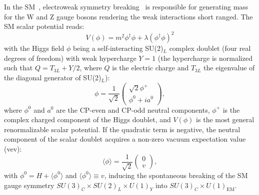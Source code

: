 In the SM~\cite{Glashow:1961tr,PhysRevLett.19.1264,PhysRevD.2.1285}, electroweak symmetry breaking~\cite{PhysRevLett.13.321,PhysRev.145.1156} is responsible for generating mass for the W and Z gauge bosons rendering the weak interactions short ranged.
The SM scalar potential reads:
\begin{equation}
    V (\phi) = m^2\phi^\dagger\phi + \lambda(\phi^\dagger\phi)^2
\end{equation}
with the Higgs field $\phi$ being a self-interacting SU(2)$_L$ complex doublet (four real degrees of freedom) with weak hypercharge $Y = 1$ (the hypercharge is normalized such that $Q = T_{3L} + Y /2$, where $Q$ is the electric charge and $T_{3L}$ the eigenvalue of the diagonal generator of SU(2)$_L$):
\begin{equation}
    \phi = \frac{1}{\sqrt{2}}
    \begin{pmatrix}
        \sqrt{2}\phi^+ \\
        \phi^0 + ia^0
    \end{pmatrix},
\end{equation}
where $\phi^0$ and $a^0$ are the CP-even and CP-odd neutral components, $\phi^+$ is the complex charged component of the Higgs doublet, and $V(\phi)$ is the most general renormalizable scalar potential.
If the quadratic term is negative, the neutral component of the scalar doublet acquires a non-zero vacuum expectation value (vev):
\begin{equation}
    \langle\phi\rangle = \frac{1}{\sqrt{2}}
    \begin{pmatrix}
        0 \\ v
    \end{pmatrix},
\end{equation}
with $\phi^0 = H+\langle\phi^0\rangle$ and $\langle\phi^0\rangle \equiv v$, inducing the spontaneous breaking of the SM gauge symmetry $SU(3)_C \times SU(2)_L \times U(1)_Y$ into $SU(3)_C \times U(1)_\text{EM}$.

